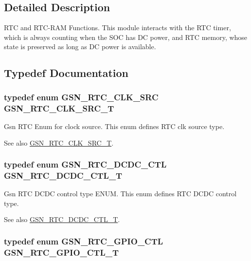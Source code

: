 \subsection{Detailed Description}
RTC and RTC-\/RAM Functions. This module interacts with the RTC timer, which is always counting when the SOC has DC power, and RTC memory, whose state is preserved as long as DC power is available. 

\subsection{Typedef Documentation}
\hypertarget{a00651_gadb97e494297aadf7b5dda5f239d96c80}{
\subsubsection[{GSN\_\-RTC\_\-CLK\_\-SRC\_\-T}]{\setlength{\rightskip}{0pt plus 5cm}typedef enum {\bf GSN\_\-RTC\_\-CLK\_\-SRC} {\bf GSN\_\-RTC\_\-CLK\_\-SRC\_\-T}}}
\label{a00651_gadb97e494297aadf7b5dda5f239d96c80}


Gsn RTC Enum for clock source. This enum defines RTC clk source type. 

\begin{DoxySeeAlso}{See also}
\hyperlink{a00651_gadb97e494297aadf7b5dda5f239d96c80}{GSN\_\-RTC\_\-CLK\_\-SRC\_\-T}. 
\end{DoxySeeAlso}
\hypertarget{a00651_gadac67c4bef428c38b07db46ce0a24d23}{
\subsubsection[{GSN\_\-RTC\_\-DCDC\_\-CTL\_\-T}]{\setlength{\rightskip}{0pt plus 5cm}typedef enum {\bf GSN\_\-RTC\_\-DCDC\_\-CTL} {\bf GSN\_\-RTC\_\-DCDC\_\-CTL\_\-T}}}
\label{a00651_gadac67c4bef428c38b07db46ce0a24d23}


Gsn RTC DCDC control type ENUM. This enum defines RTC DCDC control type. 

\begin{DoxySeeAlso}{See also}
\hyperlink{a00651_gadac67c4bef428c38b07db46ce0a24d23}{GSN\_\-RTC\_\-DCDC\_\-CTL\_\-T}. 
\end{DoxySeeAlso}
\hypertarget{a00651_gaac2b2cc7a6f64a96caddc19f3b3df78b}{
\subsubsection[{GSN\_\-RTC\_\-GPIO\_\-CTL\_\-T}]{\setlength{\rightskip}{0pt plus 5cm}typedef enum {\bf GSN\_\-RTC\_\-GPIO\_\-CTL} {\bf GSN\_\-RTC\_\-GPIO\_\-CTL\_\-T}}}
\label{a00651_gaac2b2cc7a6f64a96caddc19f3b3df78b}


